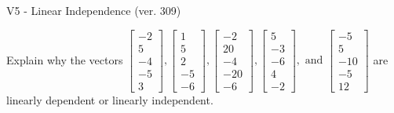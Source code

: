 \begin{exercise}
  \begin{exerciseTitle}V5 - Linear Independence (ver. 309)\end{exerciseTitle}
  \begin{exerciseStatement}
    Explain why the vectors \(\left[\begin{array}{r}
-2 \\
5 \\
-4 \\
-5 \\
3
\end{array}\right] , \left[\begin{array}{r}
1 \\
5 \\
2 \\
-5 \\
-6
\end{array}\right] , \left[\begin{array}{r}
-2 \\
20 \\
-4 \\
-20 \\
-6
\end{array}\right] , \left[\begin{array}{r}
5 \\
-3 \\
-6 \\
4 \\
-2
\end{array}\right] , \text{ and } \left[\begin{array}{r}
-5 \\
5 \\
-10 \\
-5 \\
12
\end{array}\right]\) are linearly dependent or linearly independent.	



\end{exerciseStatement}
\end{exercise}
